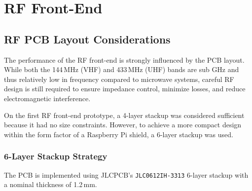 \chapter{RF Front-End}
\label{ch:rf-frontend}
\section{RF PCB Layout Considerations}
\label{sec:rf_layout}

The performance of the RF front-end is strongly influenced by the PCB layout. While both the 144\,MHz (VHF) and 433\,MHz (UHF) bands are sub GHz and thus relatively low in frequency compared to microwave systems, careful RF design is still required to ensure impedance control, minimize losses, and reduce electromagnetic interference.

On the first RF front-end prototype, a 4-layer stackup was considered sufficient because it had no size constraints. However, to achieve a more compact design within the form factor of a Raspberry Pi shield, a 6-layer stackup was used.

\subsection{6-Layer Stackup Strategy}

The PCB is implemented using JLCPCB's \texttt{JLC0612IH-3313} 6-layer stackup with a nominal thickness of 1.2\,mm.

